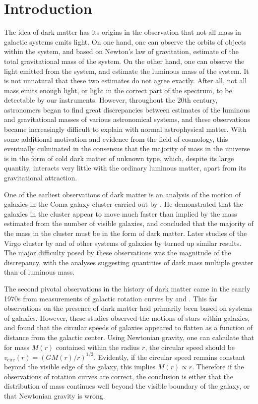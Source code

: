 \documentclass[b5paper, 10pt, twoside]{book}
\begin{document}
\cleardoublepage
\mainmatter

\chapter{Introduction}

The idea of dark matter has its origins in the observation that not all mass in galactic systems emits light. On one hand, one can observe the orbits of objects within the system, and based on Newton's law of gravitation, estimate of the total gravitational mass of the system. On the other hand, one can observe the light emitted from the system, and estimate the luminous mass of the system. It is not unnatural that these two estimates do not agree exactly. After all, not all mass emits enough light, or light in the correct part of the spectrum, to be detectable by our instruments. However, throughout the 20th century, astronomers began to find great discrepancies between estimates of the luminous and gravitational masses of various astronomical systems, and these observations became increasingly difficult to explain with normal astrophysical matter. With some additional motivation and evidence from the field of cosmology, this eventually culminated in the consensus that the majority of mass in the universe is in the form of cold dark matter of unknown type, which, despite its large quantity, interacts very little with the ordinary luminous matter, apart from its gravitational attraction.

One of the earliest observations of dark matter is an analysis of the motion of galaxies in the Coma galaxy cluster carried out by \textcite{Zwicky1933}. He demonstrated that the galaxies in the cluster appear to move much faster than implied by the mass estimated from the number of visible galaxies, and concluded that the majority of the mass in the cluster must be in the form of dark matter. Later studies of the Virgo cluster by \textcite{Smith1936} and of other systems of galaxies by \textcite{Holmberg1937} turned up similar results. The major difficulty posed by these observations was the magnitude of the discrepancy, with the analyses suggesting quantities of dark mass multiple greater than of luminous mass.

The second pivotal observations in the history of dark matter came in the eanrly 1970s from measurements of galactic rotation curves by \textcite{RubinFord1970} and \textcite{Freeman1970}. This far observations on the presence of dark matter had primarily been based on systems of galaxies. However, these studies observed the motions of stars within galaxies, and found that the circular speeds of galaxies appeared to flatten as a function of distance from the galactic center. Using Newtonian gravity, one can calculate that for mass $M(r)$ contained within the radius $r$, the circular speed should be $v_\text{circ}(r)=(GM(r)/r)^{1/2}$. Evidently, if the circular speed remains constant beyond the visible edge of the galaxy, this implies $M(r)\propto r$. Therefore if the observations of rotation curves are correct, the conclusion is either that the distribution of mass continues well beyond the visible boundary of the galaxy, or that Newtonian gravity is wrong.
\end{document}
